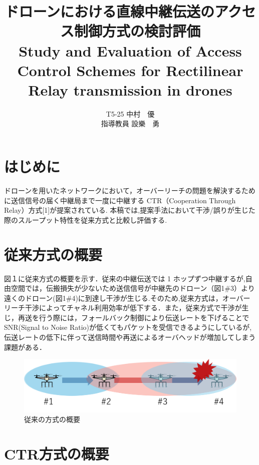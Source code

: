 \documentclass[a4paper,10pt]{ltjsarticle}
\title{\huge ドローンにおける直線中継伝送のアクセス制御方式の検討評価\\
\Large Study and Evaluation of Access Control Schemes for Rectilinear Relay transmission in drones
}
\author{
T5-25 \:中村　優\\
指導教員 \: 設樂　勇
}
\date{}
\begin{document}
\twocolumn[
\maketitle
]

\section{はじめに}
ドローンを用いたネットワークにおいて，オーバーリーチの問題を解決するために送信信号の届く中継局まで一度に中継する CTR（Cooperation Through Relay）方式[1]が提案されている. 本稿では,提案手法において干渉/誤りが生じた際のスループット特性を従来方式と比較し評価する.
\section{従来方式の概要}
図１に従来方式の概要を示す．従来の中継伝送では 1 ホップずつ中継するが,自由空間では，伝搬損失が少ないため送信信号が中継先のドローン（図1\#3）より遠くのドローン(図1\#4)に到達し干渉が生じる.そのため,従来方式は，オーバーリーチ干渉によってチャネル利用効率が低下する．また，従来方式で干渉が生じ，再送を行う際には，フォールバック制御により伝送レートを下げることでSNR(Signal to Noise Ratio)が低くてもパケットを受信できるようにしているが,伝送レートの低下に伴って送信時間や再送によるオーバヘッドが増加してしまう課題がある．


\begin{figure}[htbp]
  \centering
  \includegraphics[width=\linewidth]{cenventional_topology.png} %
  \caption{従来の方式の概要}
  \label{fig:従来の方式のトポロジー} %
\end{figure}

\section{CTR方式の概要}
\end{document}
